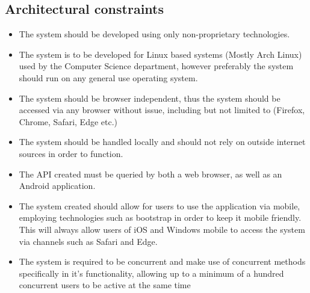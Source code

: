 \documentclass{article}
\begin{document}
	\subsection{Architectural constraints}\label{subsec:constraints}
		\begin{itemize}
			\item The system should be developed using only non-proprietary technologies.
			\item The system is to be developed for Linux based systems (Mostly Arch Linux) used by the Computer Science department, however preferably the system should run on any general use operating system.
			\item The system should be browser independent, thus the system should be accessed via any browser without issue, including but not limited to (Firefox, Chrome, Safari, Edge etc.)
			\item The system should be handled locally and should not rely on outside internet sources in order to function.
			\item The API created must be queried by both a web browser, as well as an Android application.
			\item The system created should allow for users to use the application via mobile, employing technologies such as bootstrap in order to keep it mobile friendly. This will always allow users of iOS and Windows mobile to access the system via channels such as Safari and Edge.
			\item The system is required to be concurrent and make use of concurrent methods specifically in it's functionality, allowing up to a minimum of a hundred concurrent users to be active at the same time
		\end{itemize}

	
\end{document}
